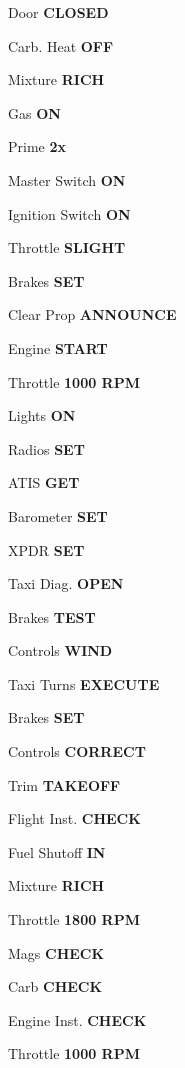 \documentclass{article}
\begin{document}
\begin{multicols*}{3}
Door \dotfill \textbf{CLOSED}

Carb. Heat \dotfill \textbf{OFF}

Mixture \dotfill \textbf{RICH}

Gas \dotfill \textbf{ON}

\colorbox{orange!80}{}

Prime \dotfill \textbf{2x}

Master Switch \dotfill \textbf{ON}

Ignition Switch \dotfill \textbf{ON}

Throttle \dotfill \textbf{SLIGHT}

Brakes \dotfill \textbf{SET}

Clear Prop \dotfill \textbf{ANNOUNCE}

Engine \dotfill \textbf{START}

Throttle \dotfill \textbf{1000 RPM}

Lights \dotfill \textbf{ON}

Radios \dotfill \textbf{SET}

ATIS \dotfill \textbf{GET}

Barometer \dotfill \textbf{SET}

XPDR \dotfill \textbf{SET}

Taxi Diag. \dotfill \textbf{OPEN}

\colorbox{green!80!red}{}

Brakes \dotfill \textbf{TEST}

Controls \dotfill \textbf{WIND}

Taxi Turns \dotfill \textbf{EXECUTE}

\colorbox{green!80!red}{}

Brakes \dotfill \textbf{SET}

Controls \dotfill \textbf{CORRECT}

Trim \dotfill \textbf{TAKEOFF}

Flight Inst. \dotfill \textbf{CHECK}

Fuel Shutoff \dotfill \textbf{IN}

Mixture \dotfill \textbf{RICH}

Throttle \dotfill \textbf{1800 RPM}

Mags \dotfill \textbf{CHECK}

Carb \dotfill \textbf{CHECK}

Engine Inst. \dotfill \textbf{CHECK}

Throttle \dotfill \textbf{1000 RPM}


\end{multicols*}
\end{document}

